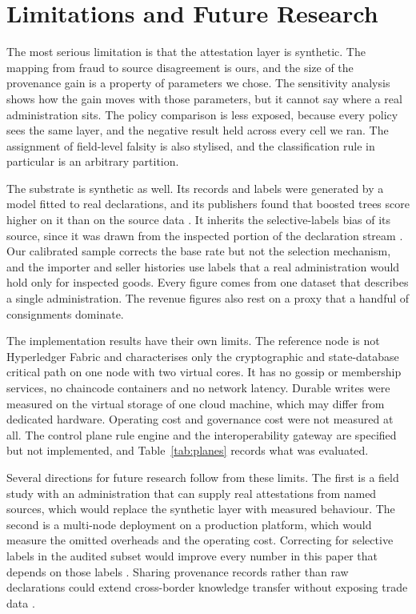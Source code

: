 \documentclass[information,article,submit,moreauthors]{Definitions/mdpi}
\begin{document}
\section{Limitations and Future Research}\label{sec:limitations}

The most serious limitation is that the attestation layer is synthetic. The mapping from fraud to source disagreement is ours, and the size of the provenance gain is a property of parameters we chose. The sensitivity analysis shows how the gain moves with those parameters, but it cannot say where a real administration sits. The policy comparison is less exposed, because every policy sees the same layer, and the negative result held across every cell we ran. The assignment of field-level falsity is also stylised, and the classification rule in particular is an arbitrary partition.

The substrate is synthetic as well. Its records and labels were generated by a model fitted to real declarations, and its publishers found that boosted trees score higher on it than on the source data \cite{jeong2022dataset}. It inherits the selective-labels bias of its source, since it was drawn from the inspected portion of the declaration stream \cite{jeong2022dataset,kim2023activelearning}. Our calibrated sample corrects the base rate but not the selection mechanism, and the importer and seller histories use labels that a real administration would hold only for inspected goods. Every figure comes from one dataset that describes a single administration. The revenue figures also rest on a proxy that a handful of consignments dominate.

The implementation results have their own limits. The reference node is not Hyperledger Fabric and characterises only the cryptographic and state-database critical path on one node with two virtual cores. It has no gossip or membership services, no chaincode containers and no network latency. Durable writes were measured on the virtual storage of one cloud machine, which may differ from dedicated hardware. Operating cost and governance cost were not measured at all. The control plane rule engine and the interoperability gateway are specified but not implemented, and Table~\ref{tab:planes} records what was evaluated.

Several directions for future research follow from these limits. The first is a field study with an administration that can supply real attestations from named sources, which would replace the synthetic layer with measured behaviour. The second is a multi-node deployment on a production platform, which would measure the omitted overheads and the operating cost. Correcting for selective labels in the audited subset would improve every number in this paper that depends on those labels \cite{singh2023graphfc}. Sharing provenance records rather than raw declarations could extend cross-border knowledge transfer without exposing trade data \cite{park2022domain}.
\end{document}
